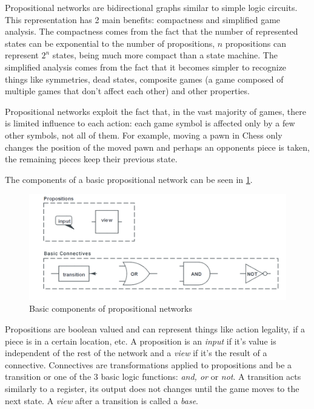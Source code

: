 Propositional networks are bidirectional graphs similar to simple logic circuits.
This representation has 2 main benefits: compactness and simplified game analysis.
The compactness comes from the fact that the number of represented states can be exponential to the number of propositions, $n$ propositions can represent $2^{n}$ states, being much more compact than a state machine.
The simplified analysis comes from the fact that it becomes simpler to recognize things like symmetries, dead states, composite games (a game composed of multiple games that don't affect each other) and other properties.

Propositional networks exploit the fact that, in the vast majority of games, there is limited influence to each action: each game symbol is affected only by a few other symbols, not all of them. For example, moving a pawn in Chess only changes the position of the moved pawn and perhaps an opponents piece is taken, the remaining pieces keep their previous state.

The components of a basic propositional network can be seen in \ref{fig:propnets components}.

\begin{figure}[h]
	\centering
    \includegraphics[scale=0.45]{images/propnets_components.png}
    \caption{Basic components of propositional networks}
    \label{fig:propnets components}
\end{figure}

Propositions are boolean valued and can represent things like action legality, if a piece is in a certain location, etc. A proposition is an \textit{input} if it's value is independent of the rest of the network and a \textit{view} if it's the result of a connective.
Connectives are transformations applied to propositions and be a transition or one of the 3 basic logic functions: \textit{and, or} or \textit{not}. A transition acts similarly to a register, its output does not changes until the game moves to the next state. A \textit{view} after a transition is called a \textit{base}.

